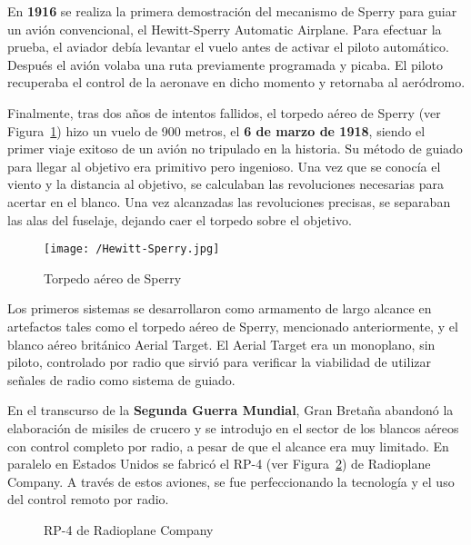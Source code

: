 En \textbf{1916} se realiza la primera demostración del mecanismo de Sperry para guiar un avión convencional, 
el Hewitt-Sperry Automatic Airplane. Para efectuar la prueba, el aviador debía levantar el vuelo antes de activar el piloto automático. Después el avión volaba una ruta previamente programada y picaba. El piloto recuperaba el control de la aeronave en dicho momento y retornaba al aeródromo.

Finalmente, tras dos años de intentos fallidos, el torpedo aéreo de Sperry (ver Figura~\ref{fig:hewittsperry}) hizo un vuelo de 900 metros, el \textbf{6 de marzo de 1918}, siendo el primer viaje exitoso de un avión no tripulado en la historia. Su método de guiado para llegar al objetivo era primitivo pero ingenioso. Una vez que se conocía el viento y la distancia al objetivo, se calculaban las revoluciones necesarias para acertar en el blanco. Una vez alcanzadas las revoluciones precisas, se separaban las alas del fuselaje, dejando caer el torpedo sobre el objetivo.

\begin{figure}[!h]
\begin{center}
\texttt{[image: /Hewitt-Sperry.jpg]}
\caption[Caption]{Torpedo aéreo de Sperry}
\label{fig:hewittsperry}
\end{center}
\end{figure}

Los primeros sistemas se desarrollaron como armamento de largo alcance en artefactos tales como el torpedo aéreo de Sperry, mencionado anteriormente, y el blanco aéreo británico Aerial Target. El Aerial Target era un monoplano, sin piloto, controlado por radio que sirvió para verificar la viabilidad de utilizar señales de radio como sistema de guiado.

En el transcurso de la \textbf{Segunda Guerra Mundial}, Gran Bretaña abandonó la elaboración de misiles de crucero y se introdujo en el sector de los blancos aéreos con control completo por radio, a pesar de que el alcance era muy limitado.
En paralelo en Estados Unidos se fabricó el RP-4 (ver Figura~\ref{fig:rp4}) de Radioplane Company. A través de estos aviones, se fue perfeccionando la tecnología y el uso del control remoto por radio.

\begin{figure}[!h]
\begin{center}
\caption[Caption]{RP-4 de Radioplane Company}
\label{fig:rp4}
\end{center}
\end{figure}

